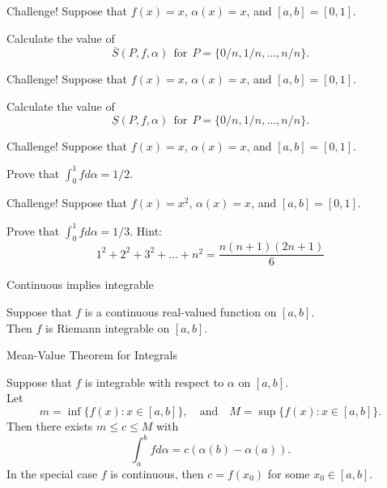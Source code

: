 \documentclass{beamer}
\begin{document}
\begin{frame}{Challenge!}
Suppose that $f(x) = x$, $\alpha(x) = x$, and $[a,b] = [0,1]$.\\
\begin{prob}
Calculate the value of
$$\overline S(P,f,\alpha)\ \ \text{for}\ \ P = \{0/n,1/n,\dots,n/n\}.$$
\end{prob}
\end{frame}

\begin{frame}{Challenge!}
Suppose that $f(x) = x$, $\alpha(x) = x$, and $[a,b] = [0,1]$.\\
\begin{prob}
Calculate the value of
$$\underline S(P,f,\alpha)\ \ \text{for}\ \ P = \{0/n,1/n,\dots,n/n\}.$$
\end{prob}
\end{frame}

\begin{frame}{Challenge!}
Suppose that $f(x) = x$, $\alpha(x) = x$, and $[a,b] = [0,1]$.\\
\begin{prob}
Prove that $\int_0^1 f d\alpha = 1/2$.
\end{prob}
\end{frame}

\begin{frame}{Challenge!}
Suppose that $f(x) = x^2$, $\alpha(x) = x$, and $[a,b] = [0,1]$.\\
\begin{prob}
Prove that $\int_0^1 f d\alpha = 1/3$.
Hint:
$$1^2 + 2^2 + 3^2 + \dots + n^2 = \frac{n(n+1)(2n+1)}{6}$$
\end{prob}
\end{frame}

\begin{frame}{Continuous implies integrable}
\begin{thm}
Suppose that $f$ is a continuous real-valued function on $[a,b]$.\\
Then $f$ is Riemann integrable on $[a,b]$.
\end{thm}
\end{frame}

\begin{frame}{Mean-Value Theorem for Integrals}
\begin{thm}
Suppose that $f$ is integrable with respect to $\alpha$ on $[a,b]$.\\
Let
$$m = \inf\{f(x): x\in [a,b]\},\quad\text{and}\quad M = \sup\{f(x): x\in [a,b]\}.$$
Then there exists $m\leq c\leq M$ with
$$\int_a^b f d\alpha = c(\alpha(b)-\alpha(a)).$$
In the special case $f$ is continuous, then $c = f(x_0)$ for some $x_0\in [a,b]$.
\end{thm}
\end{frame}
\end{document}
